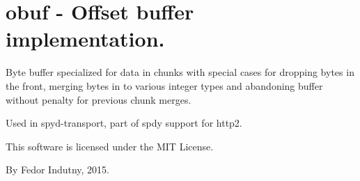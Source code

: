 \chapter{obuf -\/ Offset buffer implementation.}
\hypertarget{md_node__modules_2obuf_2README}{}\label{md_node__modules_2obuf_2README}
\label{md_node__modules_2obuf_2README_autotoc_md20104}%
%
 Byte buffer specialized for data in chunks with special cases for dropping bytes in the front, merging bytes in to various integer types and abandoning buffer without penalty for previous chunk merges.

Used in spyd-\/transport, part of spdy support for http2.

This software is licensed under the MIT License.

By Fedor Indutny, 2015. 